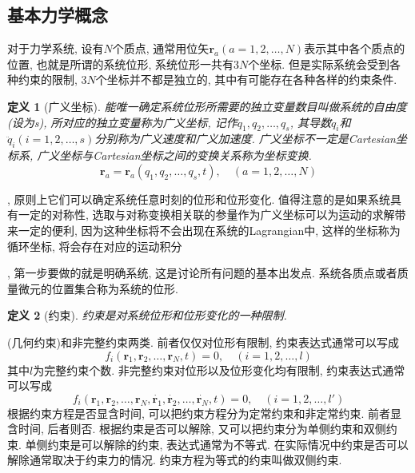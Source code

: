 \documentclass[a4paper,11pt]{book}
\newtheorem{definition}{\hspace{2em}定义}[section]
\begin{document}
\subsection{基本力学概念}
对于力学系统, 设有$N$个质点, 通常用位矢$\mathbf{r}_a(a=1,2,\dots,N)$表示其中各个质点的位置, 也就是所谓的系统位形, 系统位形一共有$3N$个坐标. 但是实际系统会受到各种约束的限制, $3N$个坐标并不都是独立的, 其中有可能存在各种各样的约束条件.
\begin{definition}[广义坐标]
  能唯一确定系统位形所需要的独立变量数目叫做系统的自由度(设为s), 所对应的独立变量称为广义坐标, 记作$q_1,q_2,\dots,q_s$, 其导数$\dot{q}_i$和$\ddot{q}_i(i=1,2,\dots,s)$分别称为广义速度和广义加速度. 广义坐标不一定是Cartesian坐标系, 广义坐标与Cartesian坐标之间的变换关系称为坐标变换.
\begin{equation*}
  \mathbf{r}_a=\mathbf{r}_a(q_1,q_2,\dots,q_s,t),\quad (a=1,2,\dots,N)
\end{equation*}
\end{definition}
, 原则上它们可以确定系统任意时刻的位形和位形变化. 值得注意的是如果系统具有一定的对称性, 选取与对称变换相关联的参量作为广义坐标可以为运动的求解带来一定的便利, 因为这种坐标将不会出现在系统的Lagrangian中, 这样的坐标称为循环坐标, 将会存在对应的运动积分

, 第一步要做的就是明确系统, 这是讨论所有问题的基本出发点. 系统各质点或者质量微元的位置集合称为系统的位形.
\begin{definition}[约束]
  约束是对系统位形和位形变化的一种限制.
\end{definition}
(几何约束)和非完整约束两类. 前者仅仅对位形有限制, 约束表达式通常可以写成
\begin{equation*}
  f_i(\mathbf{r}_1,\mathbf{r}_2,\dots,\mathbf{r}_N,t)=0,\quad (i=1,2,\dots,l)
\end{equation*}
其中$l$为完整约束个数. 非完整约束对位形以及位形变化均有限制, 约束表达式通常可以写成
\begin{equation*}
  f_i(\mathbf{r}_1,\mathbf{r}_2,\dots,\mathbf{r}_N,\dot{\mathbf{r}_1},\dot{\mathbf{r}_2},\dots,\dot{\mathbf{r}_N},t)=0,\quad(i=1,2,\dots,l')
\end{equation*}
根据约束方程是否显含时间, 可以把约束方程分为定常约束和非定常约束. 前者显含时间, 后者则否. 根据约束是否可以解除, 又可以把约束分为单侧约束和双侧约束. 单侧约束是可以解除的约束, 表达式通常为不等式. 在实际情况中约束是否可以解除通常取决于约束力的情况. 约束方程为等式的约束叫做双侧约束.
\end{document}
